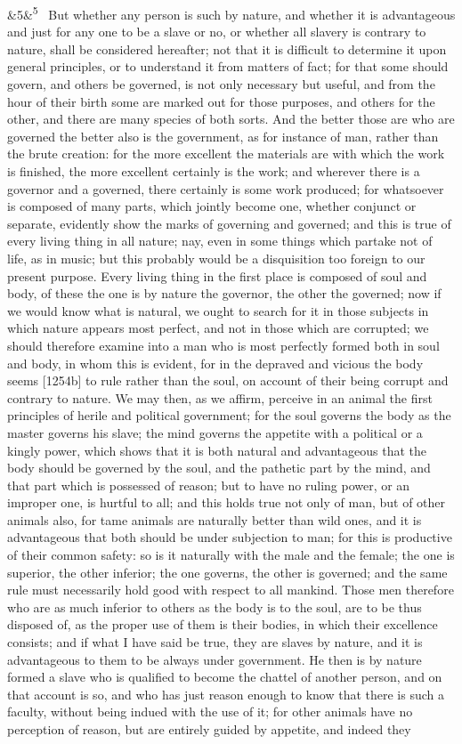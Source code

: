 \documentclass[12pt]{article}
\newcommand{\para}[1][]{\par\noindent\ifx&#1&\else\textsuperscript{\footnotesize #1}~\fi}
\begin{document}
\para[5] But whether any person is such by nature, and whether it is advantageous and just for any one to be a slave or no, or whether all slavery is contrary to nature, shall be considered hereafter; not that it is difficult to determine it upon general principles, or to understand it from matters of fact; for that some should govern, and others be governed, is not only necessary but useful, and from the hour of their birth some are marked out for those purposes, and others for the other, and there are many species of both sorts. And the better those are who are governed the better also is the government, as for instance of man, rather than the brute creation: for the more excellent the materials are with which the work is finished, the more excellent certainly is the work; and wherever there is a governor and a governed, there certainly is some work produced; for whatsoever is composed of many parts, which jointly become one, whether conjunct or separate, evidently show the marks of governing and governed; and this is true of every living thing in all nature; nay, even in some things which partake not of life, as in music; but this probably would be a disquisition too foreign to our present purpose. Every living thing in the first place is composed of soul and body, of these the one is by nature the governor, the other the governed; now if we would know what is natural, we ought to search for it in those subjects in which nature appears most perfect, and not in those which are corrupted; we should therefore examine into a man who is most perfectly formed both in soul and body, in whom this is evident, for in the depraved and vicious the body seems [1254b] to rule rather than the soul, on account of their being corrupt and contrary to nature. We may then, as we affirm, perceive in an animal the first principles of herile and political government; for the soul governs the body as the master governs his slave; the mind governs the appetite with a political or a kingly power, which shows that it is both natural and advantageous that the body should be governed by the soul, and the pathetic part by the mind, and that part which is possessed of reason; but to have no ruling power, or an improper one, is hurtful to all; and this holds true not only of man, but of other animals also, for tame animals are naturally better than wild ones, and it is advantageous that both should be under subjection to man; for this is productive of their common safety: so is it naturally with the male and the female; the one is superior, the other inferior; the one governs, the other is governed; and the same rule must necessarily hold good with respect to all mankind. Those men therefore who are as much inferior to others as the body is to the soul, are to be thus disposed of, as the proper use of them is their bodies, in which their excellence consists; and if what I have said be true, they are slaves by nature, and it is advantageous to them to be always under government. He then is by nature formed a slave who is qualified to become the chattel of another person, and on that account is so, and who has just reason enough to know that there is such a faculty, without being indued with the use of it; for other animals have no perception of reason, but are entirely guided by appetite, and indeed they 
\end{document}

